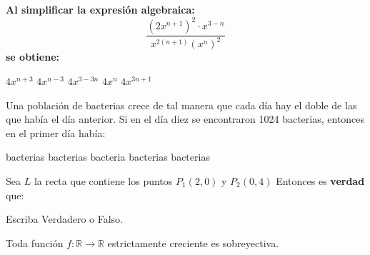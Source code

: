 \documentclass[12pt, addpoints, answers]{exam}
\newcommand{\tf}[1]{\fillin[#1][0.25in]}
\begin{document}
\begin{questions}
\begin{center}
\begin{tikzpicture}[scale=0.8]
	\end{tikzpicture}
	\shorthandon{>} %
\end{center}
\question[1] \textbf{Al simplificar la expresión algebraica: }
\begin{equation*}
	\frac{(2x^{n+1})^{2} \cdot x^{3-n}}{x^{2(n+1)}(x^{n})^{2}}
\end{equation*}
\textbf{se obtiene:}
\begin{oneparcheckboxes}
\choice $4x^{n+3}$
\choice $4x^{n-3}$
\choice $4x^{3-3n}$ %
\choice $4x^{n}$
\choice $4x^{3n+1}$	
\end{oneparcheckboxes}
\question[1] Una población de bacterias crece de tal manera que cada día hay el doble de las que había el día anterior. Si en el día diez se encontraron 1024 bacterias, entonces en el primer día había:

\begin{oneparcheckboxes}
	 bacterias
	 bacterias
	 bacteria
	 bacterias %
	 bacterias
\end{oneparcheckboxes}
\question[1]Sea $L$ la recta que contiene los puntos $P_{1}(2,0 )$ y $P_{2}(0,4)$
Entonces es \textbf{verdad} que:
\question[1] Escriba  Verdadero o Falso.

 \tf{} Toda función $f:  \mathbb{R} \rightarrow \mathbb{R}$ estrictamente creciente es sobreyectiva. %
   

\end{questions}
\end{document}
